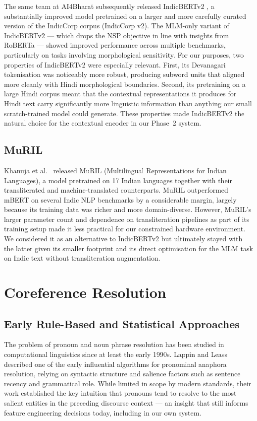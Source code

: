 \documentclass[12pt,a4paper]{report}
\begin{document}
The same team at AI4Bharat subsequently released IndicBERTv2 \cite{doddapaneni2023indicbert}, a substantially improved model pretrained on a larger and more carefully curated version of the IndicCorp corpus (IndicCorp v2). The MLM-only variant of IndicBERTv2 --- which drops the NSP objective in line with insights from RoBERTa --- showed improved performance across multiple benchmarks, particularly on tasks involving morphological sensitivity. For our purposes, two properties of IndicBERTv2 were especially relevant. First, its Devanagari tokenisation was noticeably more robust, producing subword units that aligned more cleanly with Hindi morphological boundaries. Second, its pretraining on a large Hindi corpus meant that the contextual representations it produces for Hindi text carry significantly more linguistic information than anything our small scratch-trained model could generate. These properties made IndicBERTv2 the natural choice for the contextual encoder in our Phase~2 system.

\subsection{MuRIL}

Khanuja et al.\ \cite{khanuja2021muril} released MuRIL (Multilingual Representations for Indian Languages), a model pretrained on 17 Indian languages together with their transliterated and machine-translated counterparts. MuRIL outperformed mBERT on several Indic NLP benchmarks by a considerable margin, largely because its training data was richer and more domain-diverse. However, MuRIL's larger parameter count and dependence on transliteration pipelines as part of its training setup made it less practical for our constrained hardware environment. We considered it as an alternative to IndicBERTv2 but ultimately stayed with the latter given its smaller footprint and its direct optimisation for the MLM task on Indic text without transliteration augmentation.

\section{Coreference Resolution}

\subsection{Early Rule-Based and Statistical Approaches}

The problem of pronoun and noun phrase resolution has been studied in computational linguistics since at least the early 1990s. Lappin and Leass \cite{lappin1994algorithm} described one of the early influential algorithms for pronominal anaphora resolution, relying on syntactic structure and salience factors such as sentence recency and grammatical role. While limited in scope by modern standards, their work established the key intuition that pronouns tend to resolve to the most salient entities in the preceding discourse context --- an insight that still informs feature engineering decisions today, including in our own system.
\end{document}
